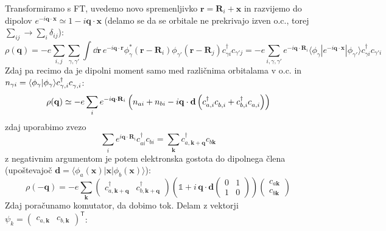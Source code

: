 \documentclass[a4paper,10pt]{article}
\renewcommand{\vec}[1]{\mathbf{#1}}
\begin{document}
Transformiramo s FT, uvedemo novo spremenljivko $\vec{r} = \vec{R}_i + \vec{x}$ in razvijemo do dipolov $e^{-i\vec{q}\cdot\vec{x}} \simeq 1 -i\vec{q}\cdot\vec{x}$ (delamo se da se orbitale ne prekrivajo izven o.c., torej $\sum_{ij}\to \sum_{i}\delta_{ij}$): 
\begin{equation}
\rho(\vec{q}) = -e \sum_{i,j} \sum_{\gamma, \gamma'} \int \dd{\vec{r}} \, e^{-i\vec{q}\cdot\vec{r}} \phi_\gamma^*(\vec{r} - \vec{R}_i) \phi_{\gamma'}(\vec{r} - \vec{R}_j) c_{\gamma i}^\dagger c_{\gamma' j} = -e \sum_{i,\gamma,\gamma'} e^{-i\vec{q}\cdot\vec{R}_i} \langle \phi_\gamma | e^{-i\vec{q}\cdot\vec{x}} | \phi_{\gamma'} \rangle c_{\gamma i}^\dagger c_{\gamma' i} 
\end{equation}
Zdaj pa recimo da je dipolni moment samo med različnima orbitalama v o.c. in $n_{\gamma i} = \langle\phi_\gamma |\phi_\gamma\rangle c_{\gamma,i}^\dagger c_{\gamma,i}^ {\vphantom{\dagger}}$:
\begin{equation}
\rho(\vec{q}) \simeq -e \sum_i e^{-i\vec{q}\cdot\vec{R}_i} \left( n_{ai} + n_{bi} - i \vec{q} \cdot \vec{d} \left( c_{a,i}^\dagger c_{b,i}^{\vphantom{\dagger}} + c_{b,i}^\dagger c_{a,i}^{\vphantom{\dagger}} \right) \right)
\end{equation}
zdaj uporabimo zvezo
\begin{equation}
\sum_i e^{i\vec{q}\cdot\vec{R}_i} c_{ai}^\dagger c_{bi} = \sum_{\vec{k}} c_{a, \vec{k}+\vec{q}}^\dagger c_{b\vec{k}}
\end{equation}
z negativnim argumentom je potem elektronska gostota do dipolnega člena (upoštevajoč $\vec{d} = \langle \phi_a(\vec{x}) | \vec{x} | \phi_b(\vec{x}) \rangle$):
\begin{equation}
\rho(-\vec{q}) = -e \sum_{\vec{k}} \begin{pmatrix} c_{a, \vec{k}+\vec{q}}^\dagger & c_{b, \vec{k}+\vec{q}}^\dagger \end{pmatrix} \left( \mathds{1} + i\, \vec{q} \cdot \vec{d} \begin{pmatrix} 0 & 1 \\ 1 & 0 \end{pmatrix} \right) \begin{pmatrix} c_{a\vec{k}} \\ c_{b\vec{k}} \end{pmatrix}
\end{equation}
Zdaj poračunamo komutator, da dobimo tok. Delam z vektorji $\psi_k = \begin{pmatrix} c_{a, \vec{k}} & c_{b, \vec{k}}\end{pmatrix}^\mathsf{T}$: 
\end{document}
